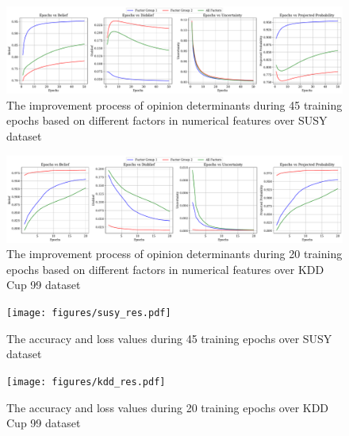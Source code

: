 \begin{figure}[!ht]  %
	\centering
	\includegraphics[scale=0.5, width=\textwidth]{figures/Results_Op_susy.pdf}
	\caption{The improvement process of opinion determinants during 45 training epochs based on different factors in numerical features over SUSY dataset}
	\label{susy_op}
\end{figure}
\begin{figure}[!ht]
	\centering
	\includegraphics[scale=0.5, width=\textwidth]{figures/Results_Op_kdd.pdf}
	\caption{The improvement process of opinion determinants during 20 training epochs based on different factors in numerical features over KDD Cup 99 dataset}
	\label{kdd_op}
\end{figure}
\begin{figure}[!ht]  %
	\centering
	\texttt{[image: figures/susy\_res.pdf]}
	\vspace{-0.7cm}
	\caption{The accuracy and loss values during 45 training epochs over SUSY dataset}
	\label{susy_loss}
\end{figure}
\begin{figure}[!ht] %
\centering
\texttt{[image: figures/kdd\_res.pdf]}
\vspace{-0.7cm}
\caption{The accuracy and loss values during 20 training epochs over KDD Cup 99 dataset}
\label{kdd_loss}
\end{figure}
